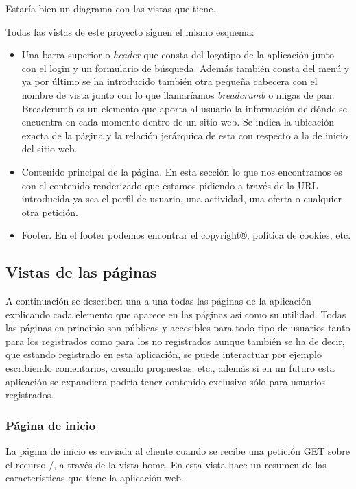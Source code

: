 Estaría bien un diagrama con las vistas que tiene.


Todas las vistas de este proyecto siguen el mismo esquema:


\begin{itemize}
\item Una barra superior o \textit{header} que consta del logotipo de la aplicación junto con el login y un formulario de búsqueda. Además también consta del menú y ya por último se ha introducido también otra pequeña cabecera con el nombre de vista junto con lo que llamaríamos \textit{breadcrumb} o migas de pan.  Breadcrumb es un elemento que aporta al usuario la información de dónde se encuentra en cada momento dentro de un sitio web. Se indica la ubicación exacta de la página y la relación jerárquica de esta con respecto a la de inicio del sitio web.
\item Contenido principal de la página. En esta sección lo que nos encontramos es con el contenido renderizado que estamos pidiendo a través de la URL introducida ya sea el perfil de usuario, una actividad, una oferta o cualquier otra petición.
\item Footer. En el footer podemos encontrar el copyright®, política de cookies, etc.
\end{itemize}


\subsection{Vistas de las páginas} 
\label{subsec:vistas}

A continuación se describen una a una todas las páginas de la aplicación explicando cada elemento que aparece en las páginas así como su utilidad. Todas las páginas en principio son públicas y accesibles para todo tipo de usuarios tanto para los registrados como para los no registrados aunque también se ha de decir, que estando registrado en esta aplicación, se puede interactuar por ejemplo escribiendo comentarios, creando propuestas, etc., además si en un futuro esta aplicación se expandiera podría tener contenido exclusivo sólo para usuarios registrados.


\subsubsection{Página de inicio}
\label{subsubsec:home}


La página de inicio es enviada al cliente cuando se recibe una petición GET sobre el recurso /, a través de la vista home. En esta vista hace un resumen de las características que tiene la aplicación web.

